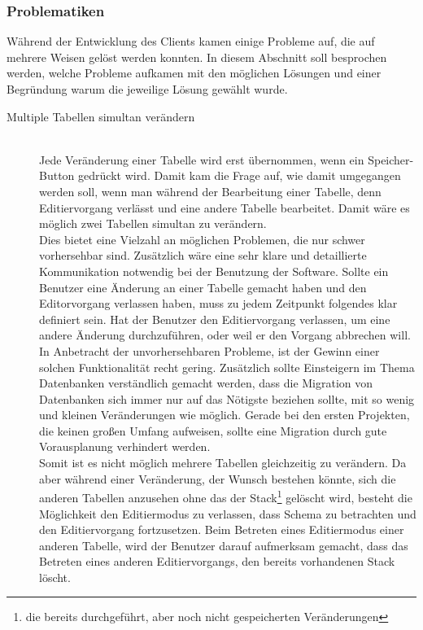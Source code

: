 \subsubsection{Problematiken}
\label{subsubsec04:problematik}

Während der Entwicklung des Clients kamen einige Probleme auf, die auf mehrere Weisen gelöst werden konnten. In diesem Abschnitt soll besprochen werden, welche Probleme aufkamen mit den möglichen Lösungen und einer Begründung warum die jeweilige Lösung gewählt wurde.

\begin{description}
\item[Multiple Tabellen simultan verändern] \hfill\\
Jede Veränderung einer Tabelle wird erst übernommen, wenn ein Speicher-Button gedrückt wird. Damit kam die Frage auf, wie damit umgegangen werden soll, wenn man während der Bearbeitung einer Tabelle, denn Editiervorgang verlässt und eine andere Tabelle bearbeitet.
Damit wäre es möglich zwei Tabellen simultan zu verändern. \\
Dies bietet eine Vielzahl an möglichen Problemen, die nur schwer vorhersehbar sind. Zusätzlich wäre eine sehr klare und detaillierte Kommunikation notwendig bei der Benutzung der Software. Sollte ein Benutzer eine Änderung an einer Tabelle gemacht haben und den Editorvorgang verlassen haben, muss zu jedem Zeitpunkt folgendes klar definiert sein. Hat der Benutzer den Editiervorgang verlassen, um eine andere Änderung durchzuführen, oder weil er den Vorgang abbrechen will. In Anbetracht der unvorhersehbaren Probleme, ist der Gewinn einer solchen Funktionalität recht gering. Zusätzlich sollte Einsteigern im Thema Datenbanken verständlich gemacht werden, dass die Migration von Datenbanken sich immer nur auf das Nötigste beziehen sollte, mit so wenig und kleinen Veränderungen wie möglich. Gerade bei den ersten Projekten, die keinen großen Umfang aufweisen, sollte eine Migration durch gute Vorausplanung verhindert werden. \\
Somit ist es nicht möglich mehrere Tabellen gleichzeitig zu verändern. Da aber während einer Veränderung, der Wunsch bestehen könnte, sich die anderen Tabellen anzusehen ohne das der Stack\footnote{die bereits durchgeführt, aber noch nicht gespeicherten Veränderungen} gelöscht wird, besteht die Möglichkeit den Editiermodus zu verlassen, dass Schema zu betrachten und den Editiervorgang fortzusetzen. Beim Betreten eines Editiermodus einer anderen Tabelle, wird der Benutzer darauf aufmerksam gemacht, dass das Betreten eines anderen Editiervorgangs, den bereits vorhandenen Stack löscht.


\end{description}
